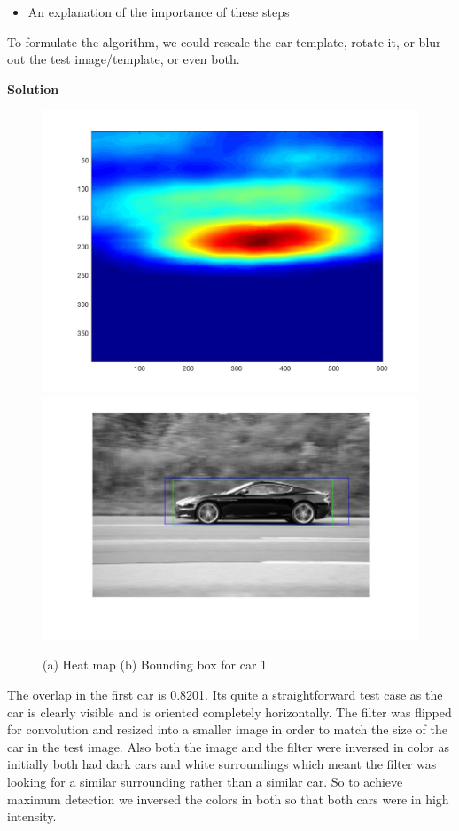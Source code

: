 \documentclass{assignment}
\begin{document}
\begin{problemlist}
\begin{enumerate}[label*=\arabic*.]
\begin{itemize}
\item An explanation of the importance of these steps

\end{itemize}

To formulate the algorithm, we could rescale the car template, rotate it, or blur out the test image/template, or even both.

\textbf {Solution}

\begin{figure}[H]
\centering
\includegraphics[width=0.4\columnwidth]{9}
\includegraphics[width=0.4\columnwidth]{9_bbox} \\
\caption{(a) Heat map (b) Bounding box for car 1}
\label{fig:i4_3_1}
\end{figure}

The overlap in the first car is 0.8201. Its quite a straightforward test case as the car is clearly visible and is oriented completely horizontally. The filter was flipped for convolution and resized into a smaller image in order to match the size of the car in the test image. Also both the image and the filter were inversed in color as initially both had dark cars and white surroundings which meant the filter was looking for a similar surrounding rather than a similar car. So to achieve maximum detection we inversed the colors in both so that both cars were in high intensity.


\end{enumerate}
\end{problemlist}
\end{document}
